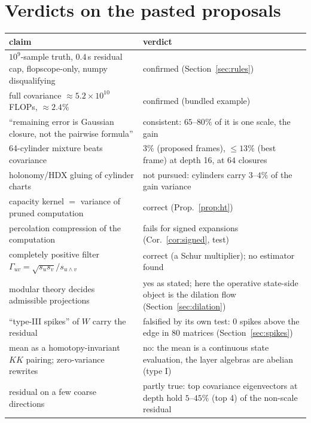 \documentclass[11pt]{article}
\theoremstyle{definition}
\theoremstyle{remark}
\begin{document}
\section{Verdicts on the pasted proposals}\label{sec:verdicts}

\begin{center}\small
\begin{tabular}{@{}p{}p{}@{}}
\toprule
claim & verdict\\
\midrule
$10^9$-sample truth, $0.4$\,s residual cap, flopscope-only, numpy disqualifying & confirmed (Section~\ref{sec:rules})\\
full covariance $\approx5.2\times10^{10}$ FLOPs, $\approx2.4\%$ & confirmed (bundled example)\\
``remaining error is Gaussian closure, not the pairwise formula'' & consistent: $65$--$80\%$ of it is one scale, the gain\\
64-cylinder mixture beats covariance & $3\%$ (proposed frames), $\le13\%$ (best frame) at depth 16, at $64$ closures\\
holonomy/HDX gluing of cylinder charts & not pursued: cylinders carry $3$--$4\%$ of the gain variance\\
capacity kernel $=$ variance of pruned computation & correct (Prop.~\ref{prop:ht})\\
percolation compression of the computation & fails for signed expansions (Cor.~\ref{cor:signed}, test)\\
completely positive filter $\Gamma_{uv}=\sqrt{s_us_v}/s_{u\wedge v}$ & correct (a Schur multiplier); no estimator found\\
modular theory decides admissible projections & yes as stated; here the operative state-side object is the dilation flow (Section~\ref{sec:dilation})\\
``type-III spikes'' of $W$ carry the residual & falsified by its own test: $0$ spikes above the edge in $80$ matrices (Section~\ref{sec:spikes})\\
mean as a homotopy-invariant $KK$ pairing; zero-variance rewrites & no: the mean is a continuous state evaluation, the layer algebras are abelian (type I)\\
residual on a few coarse directions & partly true: top covariance eigenvectors at depth hold $5$--$45\%$ (top 4) of the non-scale residual\\
\bottomrule
\end{tabular}
\end{center}
\end{document}
